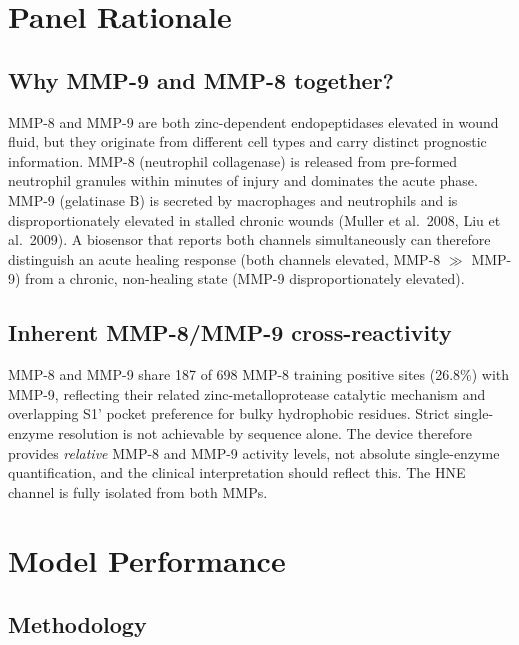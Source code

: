 \documentclass[10pt,a4paper]{article}
\begin{document}
\section{Panel Rationale}

\subsection{Why MMP-9 and MMP-8 together?}

MMP-8 and MMP-9 are both zinc-dependent endopeptidases elevated in wound
fluid, but they originate from different cell types and carry distinct
prognostic information.  MMP-8 (neutrophil collagenase) is released from
pre-formed neutrophil granules within minutes of injury and dominates the
acute phase.  MMP-9 (gelatinase B) is secreted by macrophages and
neutrophils and is disproportionately elevated in stalled chronic wounds
(Muller et al.\ 2008, Liu et al.\ 2009).  A biosensor that reports both
channels simultaneously can therefore distinguish an acute healing response
(both channels elevated, MMP-8 $\gg$ MMP-9) from a chronic, non-healing
state (MMP-9 disproportionately elevated).

\subsection{Inherent MMP-8/MMP-9 cross-reactivity}

MMP-8 and MMP-9 share 187 of 698 MMP-8 training positive sites (26.8\%)
with MMP-9, reflecting their related zinc-metalloprotease catalytic mechanism
and overlapping S1' pocket preference for bulky hydrophobic residues.
Strict single-enzyme resolution is not achievable by sequence alone.
The device therefore provides \emph{relative} MMP-8 and MMP-9 activity
levels, not absolute single-enzyme quantification, and the clinical
interpretation should reflect this.  The HNE channel is fully isolated
from both MMPs.

\section{Model Performance}

\subsection{Methodology}
\end{document}
